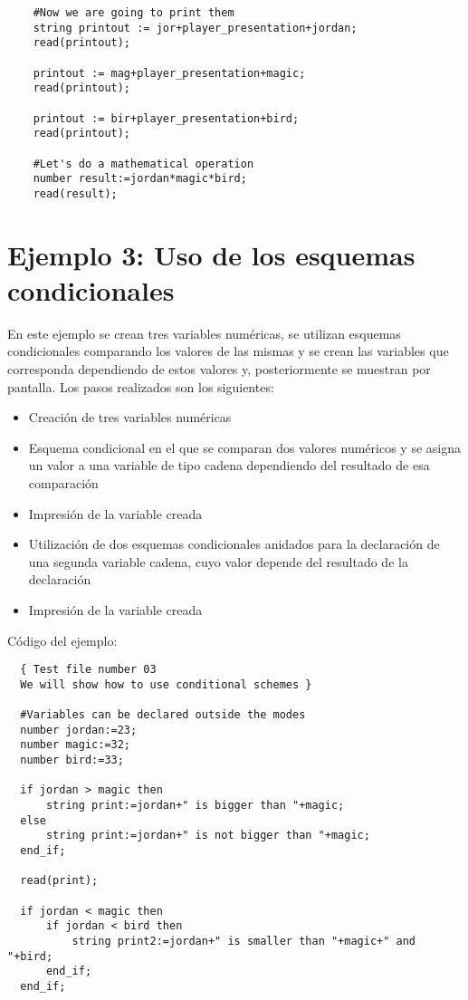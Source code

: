 \documentclass[a4paper,12pt,twoside,openright]{report}
\begin{document}
{\begin{lstlisting}
    #Now we are going to print them
    string printout := jor+player_presentation+jordan;
    read(printout);

    printout := mag+player_presentation+magic;
    read(printout);

    printout := bir+player_presentation+bird;
    read(printout);

    #Let's do a mathematical operation
    number result:=jordan*magic*bird;
    read(result);
  \end{lstlisting}

  \section{Ejemplo 3: Uso de los esquemas condicionales}
  En este ejemplo se crean tres variables numéricas, se utilizan esquemas condicionales comparando los valores de las mismas 
  y se crean las variables que corresponda dependiendo de estos valores y, posteriormente se muestran por pantalla.
  Los pasos realizados son los siguientes:
  \begin{itemize}
   \item Creación de tres variables numéricas
   \item Esquema condicional en el que se comparan dos valores numéricos y se asigna un valor a una variable de tipo cadena 
   dependiendo del resultado de esa comparación
   \item Impresión de la variable creada
   \item Utilización de dos esquemas condicionales anidados para la declaración de una segunda variable cadena, cuyo valor 
   depende del resultado de la declaración
   \item Impresión de la variable creada
  \end{itemize}
  
  Código del ejemplo:
  \begin{lstlisting}
  { Test file number 03
  We will show how to use conditional schemes }

  #Variables can be declared outside the modes
  number jordan:=23;
  number magic:=32;
  number bird:=33;

  if jordan > magic then
	  string print:=jordan+" is bigger than "+magic;
  else
	  string print:=jordan+" is not bigger than "+magic;
  end_if;

  read(print);

  if jordan < magic then
	  if jordan < bird then
		  string print2:=jordan+" is smaller than "+magic+" and "+bird;
	  end_if;
  end_if;


\end{lstlisting}}
\end{document}
